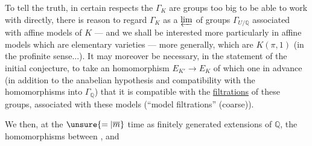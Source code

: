 To tell the truth, in certain respects the $\Gamma_K$ are groups too big to be able to work with directly, there is reason to regard $\Gamma_K$ as a $\varprojlim$ of groups $\Gamma_{U/\mathbb Q}$ associated with affine models of $K$ --- and we shall be interested more particularly in affine models which are elementary varieties --- more generally, which are $K(\pi,1)$ (in the profinite sense...). It may moreover be necessary, in the statement of the initial conjecture, to take an  homomorphism $E_{K'}\longrightarrow E_K$ of which one  in advance (in addition to the anabelian hypothesis and compatibility with the homomorphisms into $\Gamma_{\mathbb Q}$) that it is compatible with the \uline{filtrations} of these groups, associated with these models (``model filtrations'' (coarse)).

We  then, at the $\unsure{=|\overline m}$ time as finitely generated extensions of $\mathbb Q$, the homomorphisms between , and
